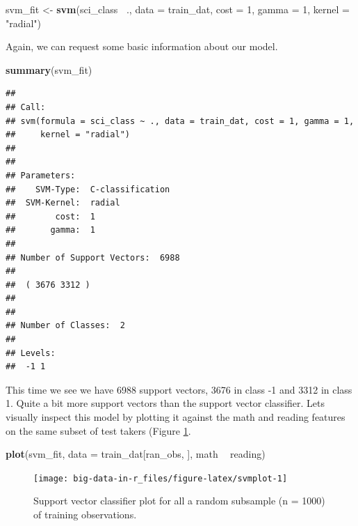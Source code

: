 \documentclass[]{book}
\newenvironment{Shaded}{\begin{snugshade}}{\end{snugshade}}
\newcommand{\DataTypeTok}[1]{\textcolor[rgb]{0.13,0.29,0.53}{#1}}
\newcommand{\DecValTok}[1]{\textcolor[rgb]{0.00,0.00,0.81}{#1}}
\newcommand{\KeywordTok}[1]{\textcolor[rgb]{0.13,0.29,0.53}{\textbf{#1}}}
\newcommand{\NormalTok}[1]{#1}
\newcommand{\OperatorTok}[1]{\textcolor[rgb]{0.81,0.36,0.00}{\textbf{#1}}}
\newcommand{\StringTok}[1]{\textcolor[rgb]{0.31,0.60,0.02}{#1}}
\begin{document}
\begin{Shaded}
\begin{Highlighting}[]
\NormalTok{svm_fit <-}\StringTok{ }\KeywordTok{svm}\NormalTok{(sci_class }\OperatorTok{~}\NormalTok{., }\DataTypeTok{data =}\NormalTok{ train_dat,}
               \DataTypeTok{cost =} \DecValTok{1}\NormalTok{,}
               \DataTypeTok{gamma =} \DecValTok{1}\NormalTok{, }
               \DataTypeTok{kernel =} \StringTok{"radial"}\NormalTok{)}
\end{Highlighting}
\end{Shaded}

Again, we can request some basic information about our model.

\begin{Shaded}
\begin{Highlighting}[]
\KeywordTok{summary}\NormalTok{(svm_fit)}
\end{Highlighting}
\end{Shaded}

\begin{verbatim}
## 
## Call:
## svm(formula = sci_class ~ ., data = train_dat, cost = 1, gamma = 1, 
##     kernel = "radial")
## 
## 
## Parameters:
##    SVM-Type:  C-classification 
##  SVM-Kernel:  radial 
##        cost:  1 
##       gamma:  1 
## 
## Number of Support Vectors:  6988
## 
##  ( 3676 3312 )
## 
## 
## Number of Classes:  2 
## 
## Levels: 
##  -1 1
\end{verbatim}

This time we see we have 6988 support vectors, 3676 in class -1 and 3312 in class 1. Quite a bit more support vectors than the support vector classifier. Lets visually inspect this model by plotting it against the math and reading features on the same subset of test takers (Figure \ref{fig:svmplot}.

\begin{Shaded}
\begin{Highlighting}[]
\KeywordTok{plot}\NormalTok{(svm_fit, }\DataTypeTok{data =}\NormalTok{ train_dat[ran_obs, ], math }\OperatorTok{~}\StringTok{ }\NormalTok{reading)}
\end{Highlighting}
\end{Shaded}

\begin{figure}
\texttt{[image: big-data-in-r\_files/figure-latex/svmplot-1]} \caption{Support vector classifier plot for all a random subsample (n = 1000) of training observations.}\label{fig:svmplot}
\end{figure}
\end{document}
